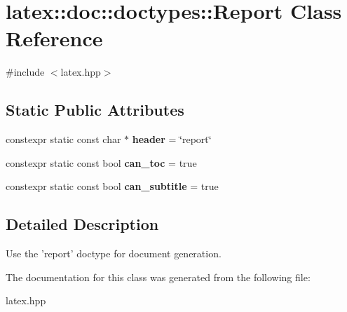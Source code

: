 \hypertarget{classlatex_1_1doc_1_1doctypes_1_1Report}{\section{latex\-:\-:doc\-:\-:doctypes\-:\-:\-Report \-Class \-Reference}
\label{classlatex_1_1doc_1_1doctypes_1_1Report}
}


{\ttfamily \#include $<$latex.\-hpp$>$}

\subsection*{\-Static \-Public \-Attributes}
\begin{DoxyCompactItemize}
\item 
\hypertarget{classlatex_1_1doc_1_1doctypes_1_1Report_a5cd2e9ac45e9d971f96302e62e5c1748}{constexpr static const char $\ast$ {\bfseries header} = \char`\"{}report\char`\"{}}\label{classlatex_1_1doc_1_1doctypes_1_1Report_a5cd2e9ac45e9d971f96302e62e5c1748}

\item 
\hypertarget{classlatex_1_1doc_1_1doctypes_1_1Report_a897a84cbb5dff210ac4f55807d692de9}{constexpr static const bool {\bfseries can\-\_\-toc} = true}\label{classlatex_1_1doc_1_1doctypes_1_1Report_a897a84cbb5dff210ac4f55807d692de9}

\item 
\hypertarget{classlatex_1_1doc_1_1doctypes_1_1Report_a7bbe0e3153ab8eaaf56cac0939afdbf0}{constexpr static const bool {\bfseries can\-\_\-subtitle} = true}\label{classlatex_1_1doc_1_1doctypes_1_1Report_a7bbe0e3153ab8eaaf56cac0939afdbf0}

\end{DoxyCompactItemize}


\subsection{\-Detailed \-Description}
\-Use the 'report' doctype for document generation. 

\-The documentation for this class was generated from the following file\-:\begin{DoxyCompactItemize}
\item 
latex.\-hpp\end{DoxyCompactItemize}
